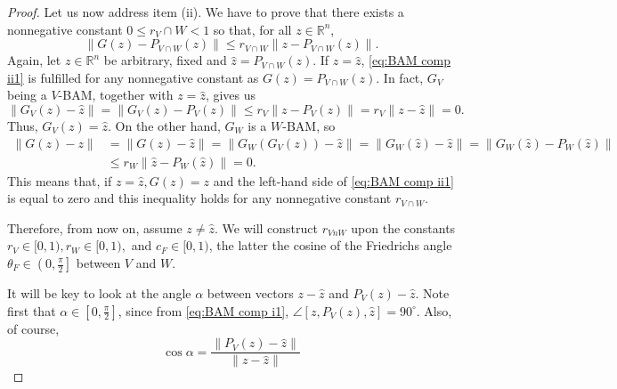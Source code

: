 \documentclass[smallextended,numbook,nospthms]{svjour3}
\theoremstyle{plain}
\theoremstyle{definition}
\def\RR{\mathds R}
\begin{document}
\begin{proof}
	Let us now address item (ii). We have to prove that there exists a nonnegative constant $0 \leq r_{V} \cap W<1$ so that, for all $z \in \RR^{n}$,
	\begin{equation}\label{eq:BAM comp ii1}
		\left\|G(z)-P_{V \cap W}(z)\right\| \leq r_{V \cap W}\left\|z-P_{V \cap W}(z)\right\|.
	\end{equation}
	Again, let $z \in \RR^{n}$ be arbitrary, fixed and $\hat{z}=P_{V \cap W}(z)$. If $z=\hat{z}$, \cref{eq:BAM comp ii1} is fulfilled for any nonnegative constant as $G(z)=P_{V \cap W}(z)$. In fact, $G_{V}$ being a $V$-BAM, together with $z=\hat{z}$, gives us
	\begin{equation}\label{eq:BAM comp ii2}
		\left\|G_{V}(z)-\hat{z}\right\|=\left\|G_{V}(z)-P_{V}(z)\right\| \leq r_{V}\left\|z-P_{V}(z)\right\|=r_{V}\|z-\hat{z}\|=0.
	\end{equation}
	Thus, $G_{V}(z)=\hat{z}$. On the other hand, $G_{W}$ is a $W$-BAM, so
	\begin{align}
		\|G(z)-z\|&=\|G(z)-\hat{z}\|=\left\|G_{W}\left(G_{V}(z)\right)-\hat{z}\right\|=\left\|G_{W}(\hat{z})-\hat{z}\right\|=\left\|G_{W}(\hat{z})-P_{W}(\hat{z})\right\| \\
		&\leq r_{W}\left\|\hat{z}-P_{W}(\hat{z})\right\|=0. \label{eq:BAM comp ii3}
	\end{align}
	This means that, if $z=\hat{z}, G(z)=z$ and the left-hand side of \cref{eq:BAM comp ii1} is equal to zero and this inequality holds for any nonnegative constant $r_{V \cap W}$.
	
	Therefore, from now on, assume $z \neq \hat{z}$. We will construct $r_{V n W}$ upon the constants $r_{V} \in[0,1), r_{W} \in[0,1),$ and $c_{F} \in[0,1)$, the latter the cosine of the Friedrichs angle $\theta_{F} \in\left(0, \frac{\pi}{2}\right]$ between $V$ and $W$.
	
	It will be key to look at the angle $\alpha$ between vectors $z-\hat{z}$ and $P_{V}(z)-\hat{z}$. Note first that $\alpha \in\left[0, \frac{\pi}{2}\right]$, since from \cref{eq:BAM comp i1}, 
	$\angle[z, P_{V}(z),\hat{z}]=90^{\circ}$. Also, of course,
	\begin{equation}\label{eq:BAM comp ii4}
		\cos \alpha=\frac{\left\|P_{V}(z)-\hat{z}\right\|}{\|z-\hat{z}\|}
	\end{equation}
	

\end{proof}
\end{document}
